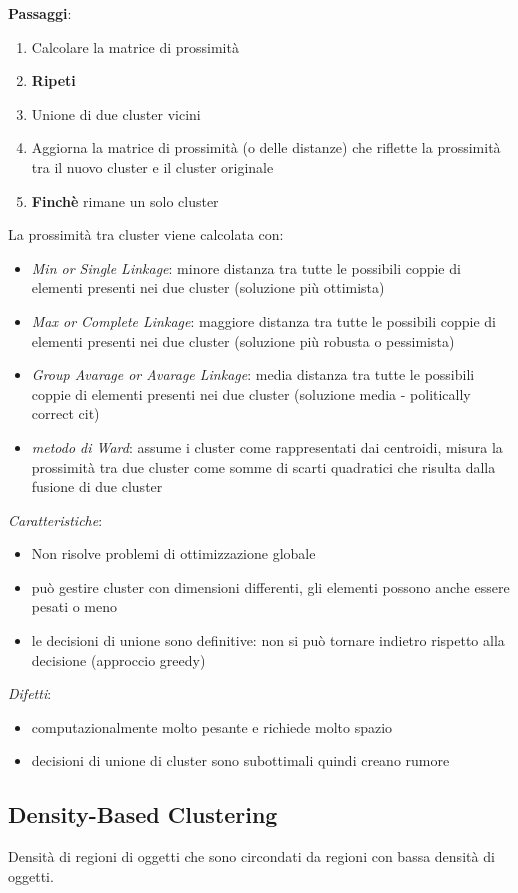 \noindent
\textbf{Passaggi}:
\begin{enumerate}
	\item Calcolare la matrice di prossimit\`a
	\item \textbf{Ripeti}
	\item Unione di due cluster vicini
	\item Aggiorna la matrice di prossimit\`a (o delle distanze) che riflette la prossimit\`a tra il nuovo cluster e il cluster originale
	\item \textbf{Finch\`e} rimane un solo cluster
\end{enumerate}
\noindent
La prossimit\`a tra cluster viene calcolata con:
\begin{itemize}
	\item  \textit{Min or Single Linkage}: minore distanza tra tutte le possibili coppie di elementi presenti nei due cluster (soluzione pi\`u ottimista)
	\item \textit{Max or Complete Linkage}: maggiore distanza tra tutte le possibili coppie di elementi presenti nei due cluster (soluzione pi\`u robusta o pessimista)
	\item \textit{Group Avarage or Avarage Linkage}: media distanza tra tutte le possibili coppie di elementi presenti nei due cluster (soluzione media - politically correct cit)
	\item \textit{metodo di Ward}: assume i cluster come rappresentati dai centroidi, misura la prossimit\`a tra due cluster come somme di scarti quadratici che risulta dalla fusione di due cluster
\end{itemize}
\noindent
\textit{Caratteristiche}:
\begin{itemize}
	\item Non risolve problemi di ottimizzazione globale
	\item pu\`o gestire cluster con dimensioni differenti, gli elementi possono anche essere pesati o meno
	\item le decisioni di unione sono definitive: non si pu\`o tornare indietro rispetto alla decisione (approccio greedy)
\end{itemize}
\noindent
\textit{Difetti}:
\begin{itemize}
	\item computazionalmente molto pesante e richiede molto spazio
	\item decisioni di unione di cluster sono subottimali quindi creano rumore
\end{itemize}

\subsection{Density-Based Clustering}
Densit\`a di regioni di oggetti che sono circondati da regioni con bassa densit\`a di oggetti.

